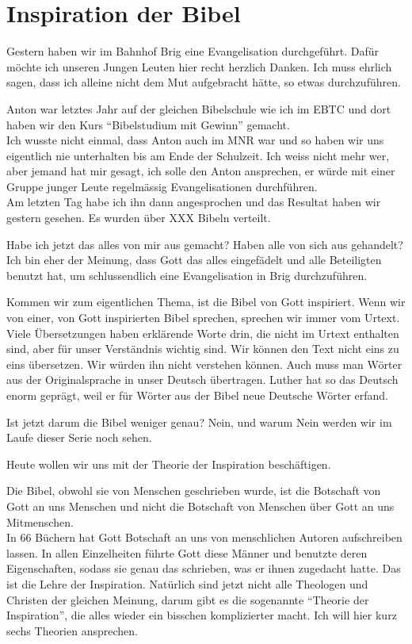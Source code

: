 \section{Inspiration der Bibel}
\begin{otsblock}[Vorwort]
    Gestern haben wir im Bahnhof Brig eine Evangelisation durchgeführt. Dafür möchte ich unseren Jungen Leuten hier recht herzlich Danken. Ich muss ehrlich sagen, dass ich alleine nicht dem Mut aufgebracht hätte, so etwas durchzuführen.

    Anton war letztes Jahr auf der gleichen Bibelschule wie ich im EBTC und dort haben wir den Kurs \enquote{Bibelstudium mit Gewinn} gemacht.\\
    Ich wusste nicht einmal, dass Anton auch im MNR war und so haben wir uns eigentlich nie unterhalten bis am Ende der Schulzeit. Ich weiss nicht mehr wer, aber jemand hat mir gesagt, ich solle den Anton ansprechen, er würde mit einer Gruppe junger Leute regelmässig Evangelisationen durchführen.\\
    Am letzten Tag habe ich ihn dann angesprochen und das Resultat haben wir gestern gesehen. Es wurden über XXX Bibeln verteilt.

    Habe ich jetzt das alles von mir aus gemacht? Haben alle von sich aus gehandelt? Ich bin eher der Meinung, dass Gott das alles eingefädelt und alle Beteiligten benutzt hat, um schlussendlich eine Evangelisation in Brig durchzuführen.

    Kommen wir zum eigentlichen Thema, ist die Bibel von Gott inspiriert. Wenn wir von einer, von Gott inspirierten Bibel sprechen, sprechen wir immer vom Urtext. Viele Übersetzungen haben erklärende Worte drin, die nicht im Urtext enthalten sind, aber für unser Verständnis wichtig sind. Wir können den Text nicht eins zu eins übersetzen. Wir würden ihn nicht verstehen können. Auch muss man Wörter aus der Originalsprache in unser Deutsch übertragen. Luther hat so das Deutsch enorm geprägt, weil er für Wörter aus der Bibel neue Deutsche Wörter erfand.

    Ist jetzt darum die Bibel weniger genau? Nein, und warum Nein werden wir im Laufe dieser Serie noch sehen.

    Heute wollen wir uns mit der Theorie der Inspiration beschäftigen.
\end{otsblock}
\begin{otsblock}[Einleitung]
    Die Bibel, obwohl sie von Menschen geschrieben wurde, ist die Botschaft von Gott an uns Menschen und nicht die Botschaft von Menschen über Gott an uns Mitmenschen.\\
    In 66 Büchern hat Gott  Botschaft an uns von menschlichen Autoren aufschreiben lassen. In allen Einzelheiten führte Gott diese Männer und benutzte deren Eigenschaften, sodass sie genau das schrieben, was er ihnen zugedacht hatte. Das ist die Lehre der Inspiration. Natürlich sind jetzt nicht alle Theologen und Christen der gleichen Meinung, darum gibt es die sogenannte \enquote{Theorie der Inspiration}, die alles wieder ein bisschen komplizierter macht.
    Ich will hier kurz sechs Theorien ansprechen.
\end{otsblock}
